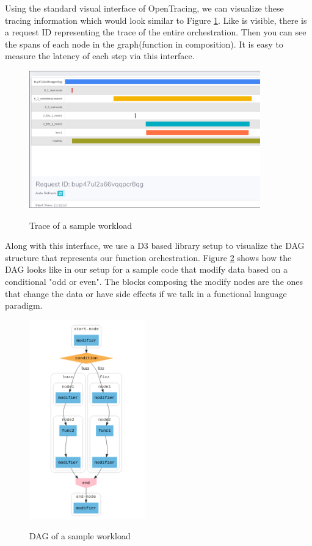 \documentclass[12pt,titlepage]{article}
\begin{document}
Using the standard visual interface of OpenTracing, we can visualize these
tracing information which would look similar to Figure \ref{fig:tracing}. Like is
visible, there is a request ID representing the trace of the entire
orchestration. Then you can see the spans of each node in the graph(function in
composition). It is easy to measure the latency of each step via this interface.

\begin{figure}[!h]
    \caption{Trace of a sample workload}
    \centering
    \includegraphics[width=100mm]{./thesis_images/tracing.png}
    \label{fig:tracing}
\end{figure}

Along with this interface, we use a D3 based library setup to visualize the DAG
structure that represents our function orchestration. Figure \ref{fig:dag} shows
how the DAG looks like in our setup for a sample code that modify data based on
a conditional "odd or even". The blocks composing the modify nodes are the ones
that change the data or have side effects if we talk in a functional language paradigm.

\begin{figure}[!h]
    \caption{DAG of a sample workload}
    \centering
    \includegraphics[width=50mm]{./thesis_images/dag.png}
    \label{fig:dag}
\end{figure}
\end{document}
